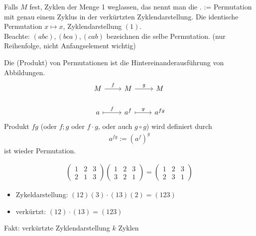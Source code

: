 Falls $M$ fest, Zyklen der Menge 1 weglassen, das nennt man die .  := Permutation mit genau einem Zyklus in der verkürtzten Zyklendarstellung. Die identische Permutation $x \mapsto x$, Zyklendarstellung $(1)$.\\
Beachte: $(abc),(bca),(cab)$ bezeichnen die selbe Permutation. (nur Reihenfolge, nicht Anfangselement wichtig)
\begin{definition}
	Die  (Produkt) von Permutationen ist die Hintereinanderausführung von Abbildungen.
	\[
	\begin{tikzcd}
		M \arrow[r, "f"]     & M \arrow[r, "g"]       & M      \\
		a \arrow[r, maps to, "f"] & a^f \arrow[r, maps to, "g"] & a^{fg}
	\end{tikzcd}
	\]
	Produkt $fg$ (oder $f;g$ oder $f\cdot g$, oder auch $g \circ g$) wird definiert durch 
	\begin{align*}
		a^{fg}:= (a^f)^g
	\end{align*} 
	ist wieder Permutation.
\end{definition}
\begin{example}
	\begin{align*}
		\begin{pmatrix}
			1 & 2 &3\\
			2 & 1 &3
		\end{pmatrix}
		\begin{pmatrix}
			1 & 2 & 3\\
			3 & 2 & 1
		\end{pmatrix}=
		\begin{pmatrix}
			1 & 2 & 3\\
			2 & 3 & 1
		\end{pmatrix}
	\end{align*}
	\begin{itemize}
		\item Zykeldarstellung: $(12)(3)\cdot (13)(2) = (123)$
		\item verkürtzt: $(12)\cdot(13) = (123)$ 
	\end{itemize}
\end{example}
Fakt: verkürtzte Zyklendarstellung $k$ Zyklen
